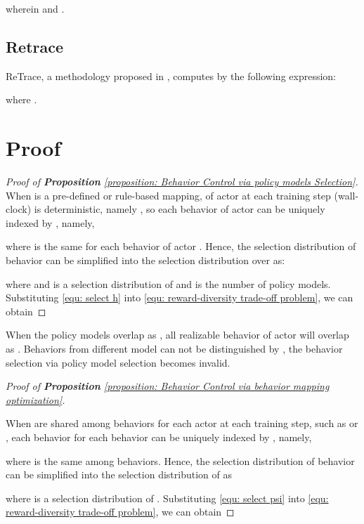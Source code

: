 wherein  and . 

\subsection{Retrace}
\label{app: retrace}
ReTrace, a methodology proposed in \citep{retrace}, computes  by the following expression:

where . 
\clearpage


\section{Proof}
\label{app: Proof}



\begin{proof}[Proof of \textbf{Proposition} \ref{proposition: Behavior Control via policy models Selection}]
\label{pf: pr 1}
When  is a pre-defined or rule-based mapping,  of actor  at each training step (wall-clock) is deterministic, namely , so each behavior of actor  can be  uniquely indexed by , namely,


where  is the same for each behavior of actor . Hence, the selection distribution of behavior can be simplified into the selection distribution over  as:

where   and  is a selection distribution of  and  is the number of policy models.
Substituting \eqref{equ: select h} into \eqref{equ: reward-diversity trade-off problem}, we can obtain



\end{proof}

\begin{Corollary}
\label{Corollary:Behavior Circling in policy model Selection}
    When the policy models overlap as  , all realizable behavior of actor  will overlap as . Behaviors from different model can not be distinguished by , the behavior selection via policy model selection becomes invalid. 
\end{Corollary}




\begin{proof}[Proof of \textbf{Proposition} \ref{proposition: Behavior Control via behavior mapping optimization}]
   \label{pf: pr 2} 

   When  are shared among behaviors for each actor at each training step, such as  or , each behavior for each behavior can be uniquely indexed by , namely, 
   

where  is the same among behaviors. Hence, the selection distribution of behavior can be simplified into the selection distribution of  as 

where   is a selection distribution of . Substituting \eqref{equ: select psi} into \eqref{equ: reward-diversity trade-off problem}, we can obtain




\end{proof}



